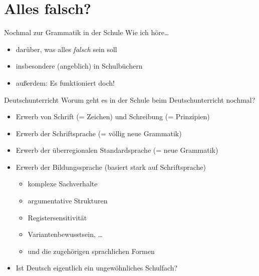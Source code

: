 \section{Alles falsch?}

\begin{frame}
  {Nochmal zur Grammatik in der Schule}
  \pause
  Wie ich höre\ldots
  \pause
  \begin{itemize}[<+->]
    \item {} darüber, was alles \textit{falsch} sein soll
    \item insbesondere (angeblich) in Schulbüchern
      \Halbzeile
    \item außerdem: \alert{Es funktioniert doch!}
  \end{itemize}
\end{frame}
  
  
  
\begin{frame}
  {Deutschunterricht}
  \pause
  \alert{Worum geht es in der Schule beim Deutschunterricht nochmal?}\\
  \Halbzeile
  \pause
  \begin{itemize}[<+->]
    \item Erwerb von Schrift (= Zeichen) und Schreibung (= Prinzipien)
    \item Erwerb der \alert{Schriftsprache} (= \alert{völlig neue Grammatik})
    \item Erwerb der \alert{überregionalen Standardsprache} (= neue Grammatik)
    \item Erwerb der \alert{Bildungssprache} (basiert stark auf Schriftsprache)
      \begin{itemize}[<+->]
        \item komplexe Sachverhalte
        \item argumentative Strukturen
        \item Registersensitivität
        \item Variantenbewusstsein, \ldots
        \item \alert{und die zugehörigen sprachlichen Formen}
      \end{itemize}
      \Halbzeile
    \item Ist Deutsch eigentlich ein ungewöhnliches Schulfach?
  \end{itemize}
\end{frame}

